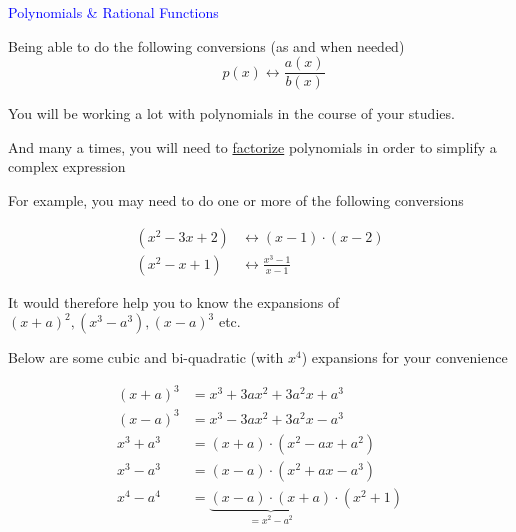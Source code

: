 \documentclass[14pt,fleqn]{extarticle}
\begin{document}
\begin{skill}
\textcolor{blue}{Polynomials \& Rational Functions}

Being able to do the following conversions (as and when needed)
\[ \qquad p(x) \longleftrightarrow \frac{a(x)}{b(x)}\]

\end{skill}

\newcard 

You will be working a lot with polynomials in the  course of your studies. \newline 

And many a times, you will need to \underline{factorize} polynomials in order to simplify a complex expression \newline 

For example, you may need to do one or more of the following conversions
 
\begin{align}
	\left(x^2 - 3x + 2 \right) &\longleftrightarrow \left(x-1 \right)\cdot \left(x-2 \right) \\
	\left(x^2-x+1 \right)&\longleftrightarrow \frac{x^3-1}{x-1}
\end{align}


It would therefore help you to know the expansions of $(x+a)^2, (x^3-a^3), (x-a)^3$ etc. \newline 

Below are some cubic and bi-quadratic (with $x^4$) expansions for your convenience 

\begin{align}
	(x+a)^3 &= x^3 + 3ax^2 + 3a^2x + a^3 \\
	(x-a)^3 &= x^3 - 3ax^2 + 3a^2 x - a^3 \\
	x^3+a^3 &= (x+a)\cdot (x^2-ax+a^2) \\ 
	x^3 - a^3 &= (x-a)\cdot (x^2 + ax  -a^3) \\ 
	x^4 - a^4 &= \underbrace{(x-a)\cdot (x+a)}_{= x^2 - a^2}\cdot (x^2 + 1) 
\end{align}
\end{document}

